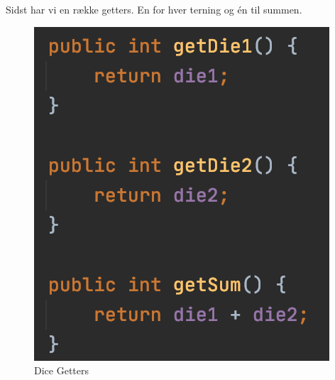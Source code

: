 Sidst har vi en række getters. En for hver terning og én til summen.
\begin{figure}[H]
    \centering
    \includegraphics[width=\textwidth]{sources/7_implementering/Dice Getters.png}
    \caption{Dice Getters}
    \label{fig:DiceGetters}
\end{figure}